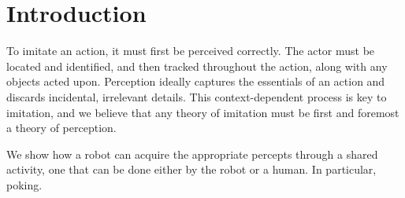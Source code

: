 

\section{Introduction}

To imitate an action, it must first be perceived correctly.  
%
The actor must be located and identified, and then tracked throughout
the action, along with any objects acted upon.
%
Perception ideally captures the essentials of an
action and discards incidental, irrelevant details.  
This context-dependent process is key to imitation, and
we believe that any theory of imitation must be first and foremost
a theory of perception.
%

We show how a robot can acquire the appropriate percepts
through a shared activity, one that can be done either
by the robot or a human.
In particular, poking.

